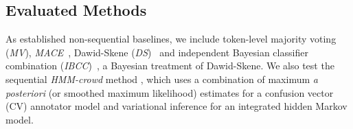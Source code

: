 \subsection{Evaluated Methods}

As established non-sequential baselines, we include token-level majority voting (\emph{MV}), \emph{MACE}~\cite{hovy2013learning}, Dawid-Skene (\emph{DS})~\cite{dawid_maximum_1979} and independent Bayesian classifier combination (\emph{IBCC})~\cite{kim2012bayesian}, a Bayesian treatment of Dawid-Skene. 
We also test the sequential \emph{HMM-crowd} method \cite{nguyen2017aggregating}, which uses a combination of 
maximum \emph{a posteriori} (or smoothed maximum likelihood) estimates for a confusion vector (CV) annotator model 
and variational inference for an integrated hidden Markov model. 

